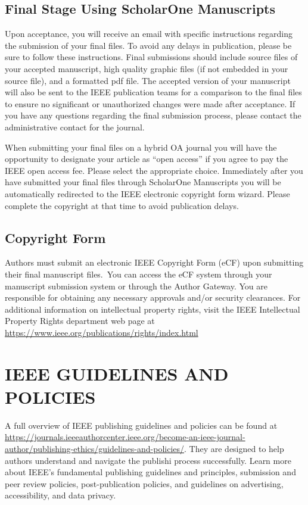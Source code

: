 \documentclass[letter]{IEEEtaes}
\begin{document}
\subsection{Final Stage Using ScholarOne Manuscripts}

Upon acceptance, you will receive an email with specific instructions regarding the submission of your final files. To avoid any delays in publication, please be sure to follow these instructions. Final submissions should include source files of your accepted manuscript, high quality graphic files (if not embedded in your source file), and a formatted pdf file. The accepted version of your manuscript will also be sent to the IEEE publication teams for a comparison to the final files to ensure no significant or unauthorized changes were made after acceptance. If you have any questions regarding the final submission process, please contact the administrative contact for the journal.

When submitting your final files on a hybrid OA journal you will have the opportunity to designate your article as ``open access'' if you agree to pay the IEEE open access fee. Please select the appropriate choice. Immediately after you have submitted your final files through ScholarOne Manuscripts you will be automatically redirected to the IEEE electronic copyright form wizard. Please complete the copyright at that time to avoid publication delays.

\subsection{Copyright Form}

Authors must submit an electronic IEEE Copyright Form (eCF) upon submitting their final manuscript files.~You can access the eCF system through your manuscript submission system or through the Author Gateway. You are responsible for obtaining any necessary approvals and/or security clearances. For additional information on intellectual property rights, visit the IEEE Intellectual Property Rights department web page at \href{https://www.ieee.org/publications/rights/index.html}{https://www.ieee.org/publications/rights/index.html}

\section{IEEE GUIDELINES AND POLICIES}

A full overview of IEEE publishing guidelines and policies can be found
at \href{https://journals.ieeeauthorcenter.ieee.org/become-an-ieee-journal-author/publishing-ethics/guidelines-and-policies/}{\url{https://journals.ieeeauthorcenter.ieee.org/become-an-ieee-journal-author/publishing-ethics/guidelines-and-policies/}}. They are designed to help authors understand and navigate the publishi process successfully. Learn more about IEEE's fundamental publishing guidelines and principles, submission and peer review policies, post-publication policies, and guidelines on advertising, accessibility, and data privacy.
\end{document}
